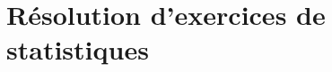 \documentclass[a4paper,11pt]{book}
\begin{document}
\chapter{R\'esolution d'exercices de statistiques}
\end{document}
